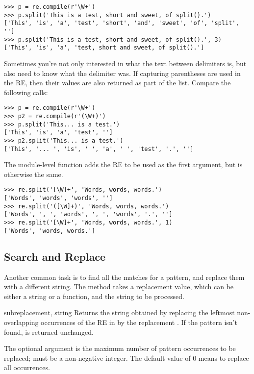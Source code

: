 \documentclass{howto}
\begin{document}
\begin{verbatim}
>>> p = re.compile(r'\W+')
>>> p.split('This is a test, short and sweet, of split().')
['This', 'is', 'a', 'test', 'short', 'and', 'sweet', 'of', 'split', '']
>>> p.split('This is a test, short and sweet, of split().', 3)
['This', 'is', 'a', 'test, short and sweet, of split().']
\end{verbatim}

Sometimes you're not only interested in what the text between
delimiters is, but also need to know what the delimiter was.  If
capturing parentheses are used in the RE, then their values are also
returned as part of the list.  Compare the following calls:

\begin{verbatim}
>>> p = re.compile(r'\W+')
>>> p2 = re.compile(r'(\W+)')
>>> p.split('This... is a test.')
['This', 'is', 'a', 'test', '']
>>> p2.split('This... is a test.')
['This', '... ', 'is', ' ', 'a', ' ', 'test', '.', '']
\end{verbatim}

The module-level function  adds the RE to be
used as the first argument, but is otherwise the same.  

\begin{verbatim}
>>> re.split('[\W]+', 'Words, words, words.')
['Words', 'words', 'words', '']
>>> re.split('([\W]+)', 'Words, words, words.')
['Words', ', ', 'words', ', ', 'words', '.', '']
>>> re.split('[\W]+', 'Words, words, words.', 1)
['Words', 'words, words.']
\end{verbatim}

\subsection{Search and Replace}

Another common task is to find all the matches for a pattern, and
replace them with a different string.  The  method takes
a replacement value, which can be either a string or a function, and
the string to be processed.

\begin{methoddesc}{sub}{replacement, string}
Returns the string obtained by replacing the leftmost non-overlapping
occurrences of the RE in  by the replacement
.  If the pattern isn't found,  is returned
unchanged.  

The optional argument  is the maximum number of pattern
occurrences to be replaced;  must be a non-negative
integer.  The default value of 0 means to replace all occurrences.
\end{methoddesc}
\end{document}
